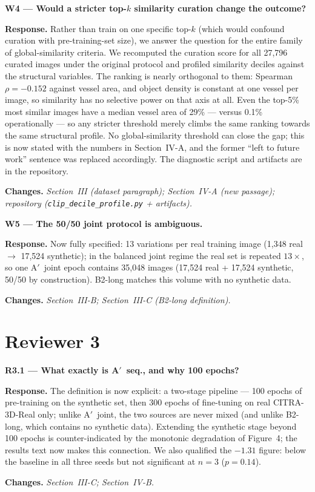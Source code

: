 \documentclass[11pt]{article}
\newcommand{\resp}[1]{\par\noindent\textbf{Response.} #1}
\newcommand{\chg}[1]{\par\noindent\textbf{Changes.} \textit{#1}}
\newcommand{\pt}[1]{\par\medskip\noindent\textbf{#1}}
\begin{document}
\pt{W4 --- Would a stricter top-$k$ similarity curation change the outcome?}
\resp{Rather than train on one specific top-$k$ (which would confound
curation with pre-training-set size), we answer the question for the entire
family of global-similarity criteria. We recomputed the curation score for all
27{,}796 curated images under the original protocol and profiled similarity
deciles against the structural variables. The ranking is nearly orthogonal to
them: Spearman $\rho=-0.152$ against vessel area, and object density is
constant at one vessel per image, so similarity has no selective power on that
axis at all. Even the top-5\% most similar images have a median vessel area of
29\% --- versus 0.1\% operationally --- so any stricter threshold merely climbs
the same ranking towards the same structural profile. No global-similarity
threshold can close the gap; this is now stated with the numbers in
Section~IV-A, and the former ``left to future work'' sentence was replaced
accordingly. The diagnostic script and artifacts are in the repository.}
\chg{Section~III (dataset paragraph); Section~IV-A (new passage); repository
(\texttt{clip\_decile\_profile.py} + artifacts).}

\pt{W5 --- The 50/50 joint protocol is ambiguous.}
\resp{Now fully specified: 13 variations per real training image (1{,}348
real $\rightarrow$ 17{,}524 synthetic); in the balanced joint regime the real
set is repeated $13\times$, so one A$'$~joint epoch contains 35{,}048 images
(17{,}524 real + 17{,}524 synthetic, 50/50 by construction). B2-long matches
this volume with no synthetic data.}
\chg{Section~III-B; Section~III-C (B2-long definition).}

\section*{Reviewer 3}

\pt{R3.1 --- What exactly is A$'$~seq., and why 100 epochs?}
\resp{The definition is now explicit: a two-stage pipeline --- 100 epochs of
pre-training on the synthetic set, then 300 epochs of fine-tuning on real
CITRA-3D-Real only; unlike A$'$~joint, the two sources are never mixed (and
unlike B2-long, which contains no synthetic data). Extending the synthetic
stage beyond 100 epochs is counter-indicated by the monotonic degradation of
Figure~4; the results text now makes this connection. We also qualified the
$-1.31$ figure: below the baseline in all three seeds but not significant at
$n{=}3$ ($p=0.14$).}
\chg{Section~III-C; Section~IV-B.}
\end{document}
